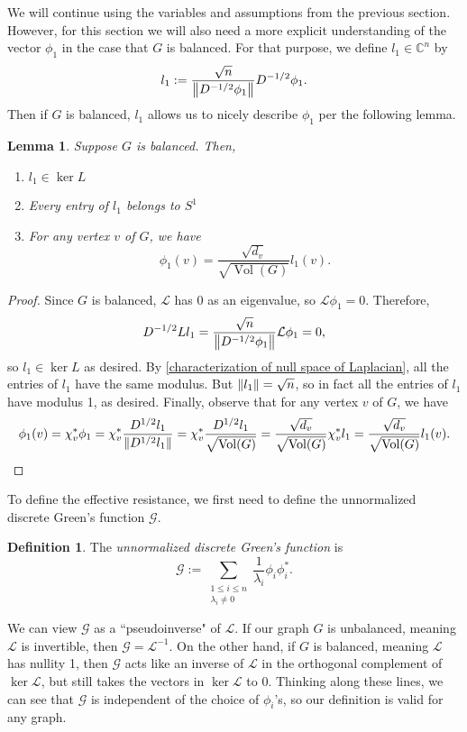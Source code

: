 \documentclass[12pt]{article}
\newtheorem{lem}[thm]{Lemma}
\theoremstyle{definition}
\newtheorem{defn}[thm]{Definition}
\newcommand{\C}{\mathbb C}
\DeclarePairedDelimiter\norm{\lVert}{\rVert}
\DeclareMathOperator{\vol}{Vol}
\newcommand{\lap}{\mathcal{L}}
\newcommand{\green}{\mathcal{G}}
\begin{document}
We will continue using the variables and assumptions from the previous section. However,
for this section we will also need a more explicit understanding of the vector $\phi_1$ in the case that $G$ is balanced. For that purpose, we define $l_1 \in \C^n$ by 
$$
l_1 := \frac{\sqrt{n}}{\norm*{D^{-1/2} \phi_1}} D^{-1/2} \phi_1. 
$$
Then if $G$ is balanced, $l_1$ allows us to nicely describe $\phi_1$ per the following lemma.

\begin{lem}
Suppose $G$ is balanced. Then,
\begin{enumerate}
\item $l_1 \in \ker L$
\item Every entry of $l_1$ belongs to $S^1$
\item For any vertex $v$ of $G$, we have 
$$
\phi_1(v) = \frac{\sqrt{d_v}}{\sqrt{\vol(G)}} l_1(v).
$$
\end{enumerate}
\end{lem}
\begin{proof}
Since $G$ is balanced, $\lap$ has 0 as an eigenvalue, so $\lap \phi_1 = 0.$ Therefore,
$$
D^{-1/2} L l_1 = \frac{\sqrt{n}}{\norm*{D^{-1/2} \phi_1}} \lap \phi_1 = 0,
$$
so $l_1 \in \ker L$ as desired. By \cref{characterization of null space of Laplacian}, all the entries of $l_1$ have the same modulus. But $\norm{l_1} = \sqrt{n}$, so in fact all the entries of $l_1$ have modulus 1, as desired. Finally, observe that for any vertex $v$ of $G$, we have
$$
\phi_1(v)
= \chi_v^* \phi_1
= \chi_v^* \frac{D^{1/2} l_1}{\norm{D^{1/2} l_1}} 
= \chi_v^* \frac{D^{1/2} l_1}{\sqrt{\vol(G)}}
= \frac{\sqrt{d_v}}{\sqrt{\vol(G)}} \chi_v^* l_1
= \frac{\sqrt{d_v}}{\sqrt{\vol(G)}} l_1(v).
$$
\end{proof}

To define the effective resistance, we first need to define the unnormalized discrete Green's function $\green$.

\begin{defn}
The \textit{unnormalized discrete Green's function} is 
$$
\green := \sum_{\substack{1 \leq i \leq n \\ \lambda_i \neq 0}} \frac{1}{\lambda_i} \phi_i \phi_i^*.
$$
\end{defn}

We can view $\green$ as a ``pseudoinverse" of $\lap$. If our graph $G$ is unbalanced, meaning $\lap$ is invertible, then $\green = \lap^{-1}$. On the other hand, if $G$ is balanced, meaning $\lap$ has nullity 1, then $\green$ acts like an inverse of $\lap$ in the orthogonal complement of $\ker \lap$, but still takes the vectors in $\ker \lap$ to 0. Thinking along these lines, we can see that $\green$ is independent of the choice of $\phi_i$'s, so our definition is valid for any graph.
\end{document}
